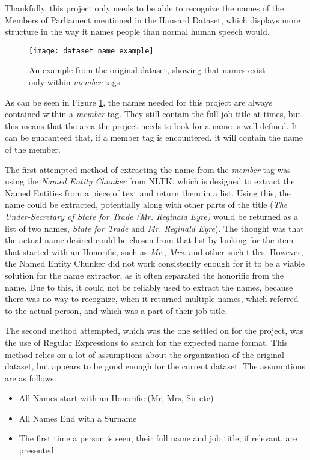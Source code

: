 Thankfully, this project only needs to be able to recognize the names of the Members of Parliament mentioned in the Hansard Dataset, which displays more structure in the way it names people than normal human speech would.

\begin{figure}[ht]
\texttt{[image: dataset\_name\_example]}
\caption{An example from the original dataset, showing that names exist only within \emph{member} tags}
\label{fig:dataset_name_example}
\end{figure}

As can be seen in Figure \ref{fig:dataset_name_example}, the names needed for this project are always contained within a \emph{member} tag. They still contain the full job title at times, but this means that the area the project needs to look for a name is well defined. It can be guaranteed that, if a member tag is encountered, it will contain the name of the member.

The first attempted method of extracting the name from the \emph{member} tag was using the \emph{Named Entity Chunker} from NLTK, which is designed to extract the Named Entities from a piece of text and return them in a list. Using this, the name could be extracted, potentially along with other parts of the title (\emph{The Under-Secretary of State for Trade (Mr. Reginald Eyre)} would be returned as a list of two names, \emph{State for Trade} and \emph{Mr. Reginald Eyre}). The thought was that the actual name desired could be chosen from that list by looking for the item that started with an Honorific, such as \emph{Mr.}, \emph{Mrs.} and other such titles. However, the Named Entity Chunker did not work consistently enough for it to be a viable solution for the name extractor, as it often separated the honorific from the name. Due to this, it could not be reliably used to extract the names, because there was no way to recognize, when it returned multiple names, which referred to the actual person, and which was a part of their job title.

The second method attempted, which was the one settled on for the project, was the use of Regular Expressions to search for the expected name format. This method relies on a lot of assumptions about the organization of the original dataset, but appears to be good enough for the current dataset. The assumptions are as follows:
\begin{itemize}
	\item All Names start with an Honorific (Mr, Mrs, Sir etc)
	\item All Names End with a Surname
	\item The first time a person is seen, their full name and job title, if relevant, are presented
\end{itemize}

